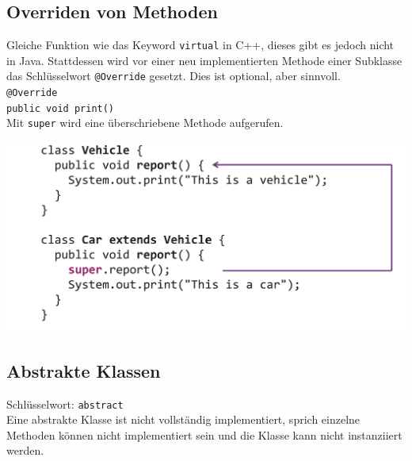 \subsection{Overriden von Methoden}
Gleiche Funktion wie das Keyword \verb|virtual| in C++, dieses gibt es jedoch nicht in Java. Stattdessen wird
vor einer neu implementierten Methode einer Subklasse das Schlüsselwort \verb|@Override| gesetzt. Dies ist optional, aber sinnvoll.\\
\verb|@Override|\\
\verb|public void print()|\\

Mit \verb|super| wird eine überschriebene Methode aufgerufen.
\begin{center}
    \includegraphics[width=0.9\columnwidth]{pictures/super.png}
\end{center}

\subsection{Abstrakte Klassen}{\label{AbstractClass}}
Schlüsselwort: \verb|abstract|\\

Eine abstrakte Klasse ist nicht vollständig implementiert, sprich einzelne Methoden können nicht implementiert 
sein und die Klasse kann nicht instanziiert werden.

